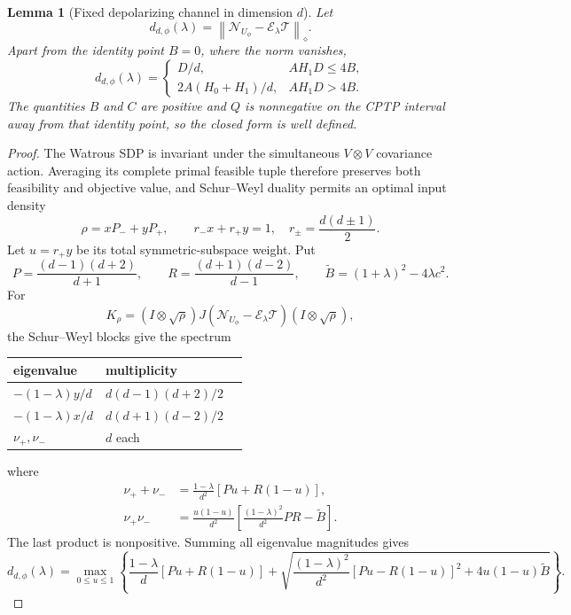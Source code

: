 \documentclass[11pt,a4paper]{article}
\newtheorem{lemma}{Lemma}
\theoremstyle{remark}
\newcommand{\cE}{\mathcal{E}}
\newcommand{\cN}{\mathcal{N}}
\newcommand{\cT}{\mathcal{T}}
\newcommand{\diamondnorm}[1]{\left\lVert #1\right\rVert_{\diamond}}
\begin{document}
\begin{lemma}[Fixed depolarizing channel in dimension $d$]
\label{lem:fixed}
Let
\[
 d_{d,\phi}(\lambda)
 =\diamondnorm{\cN_{U_\phi}-\cE_\lambda\cT}.
\]
Apart from the identity point $B=0$, where the norm vanishes,
\begin{equation}
 d_{d,\phi}(\lambda)=
 \begin{cases}
  D/d, & AH_1D\leq4B,\\[2pt]
  2A(H_0+H_1)/d, & AH_1D>4B.
 \end{cases}
 \label{eq:fixed-norm}
\end{equation}
The quantities $B$ and $C$ are positive and $Q$ is nonnegative on the CPTP
interval away from that identity point, so the closed form is well defined.
\end{lemma}

\begin{proof}
The Watrous SDP is invariant under the simultaneous $V\otimes V$ covariance
action.  Averaging its complete primal feasible tuple therefore preserves both
feasibility and objective value, and Schur--Weyl duality permits an optimal
input density
\[
 \rho=xP_-+yP_+,\qquad r_-x+r_+y=1,
 \quad r_\pm=\frac{d(d\pm1)}2.
\]
Let $u=r_+y$ be its total symmetric-subspace weight.  Put
\[
 P=\frac{(d-1)(d+2)}{d+1},\qquad
 R=\frac{(d+1)(d-2)}{d-1},\qquad
 \widetilde B=(1+\lambda)^2-4\lambda c^2.
\]
For
\[
 K_\rho=(I\otimes\sqrt\rho)
 J(\cN_{U_\phi}-\cE_\lambda\cT)
 (I\otimes\sqrt\rho),
\]
the Schur--Weyl blocks give the spectrum
\begin{center}
\begin{tabular}{@{}lll@{}}
\toprule
eigenvalue & multiplicity\\
\midrule
$-(1-\lambda)y/d$ & $d(d-1)(d+2)/2$\\
$-(1-\lambda)x/d$ & $d(d+1)(d-2)/2$\\
$\nu_+,\nu_-$ & $d$ each\\
\bottomrule
\end{tabular}
\end{center}
where
\begin{align}
 \nu_++\nu_-&=\frac{1-\lambda}{d^2}
 [Pu+R(1-u)],\nonumber\\
 \nu_+\nu_-&=\frac{u(1-u)}{d^2}
 \left[\frac{(1-\lambda)^2}{d^2}PR-\widetilde B\right].
 \label{eq:general-roots}
\end{align}
The last product is nonpositive.  Summing all eigenvalue magnitudes gives
\begin{equation}
 d_{d,\phi}(\lambda)
 =\max_{0\leq u\leq1}\left\{
 \frac{1-\lambda}{d}[Pu+R(1-u)]
 +\sqrt{\frac{(1-\lambda)^2}{d^2}[Pu-R(1-u)]^2
              +4u(1-u)\widetilde B}
 \right\}.
 \label{eq:general-u}
\end{equation}


\end{proof}
\end{document}
